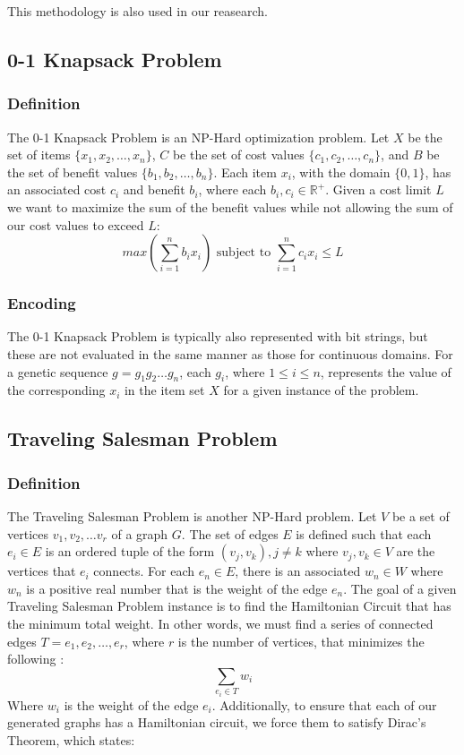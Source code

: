\noindent This methodology is also used in our reasearch.

%
%
\subsection*{0-1 Knapsack Problem}
\subsubsection*{Definition}

The 0-1 Knapsack Problem is an NP-Hard optimization problem. Let $X$ be the set of items $\{x_1, x_2, \ldots, x_n\}$, $C$ be the set of cost values $\{c_1, c_2, \ldots, c_n\}$, and $B$ be the set of benefit values $\{b_1, b_2, \ldots, b_n\}$. Each item $x_i$, with the domain $\{0,1\}$, has an associated cost $c_i$ and benefit $b_i$, where each $b_i,c_i \in \mathbb{R}^{+}$. Given a cost limit $L$ we want to maximize the sum of the benefit values while not allowing the sum of our cost values to exceed $L$:
\[ max\left( \sum\limits_{i = 1}^{n} b_ix_i \right) \text{ subject to } \sum\limits_{i = 1}^{n} c_ix_i \leq L \]

\subsubsection*{Encoding}
The  0-1 Knapsack Problem is typically also represented with bit strings, but these are not evaluated in the same manner as those for continuous domains. For a genetic sequence $g = g_1 g_2 \ldots g_n$, each $g_i$, where $1 \leq i \leq n$, represents the value of the corresponding $x_i$ in the item set $X$ for a given instance of the problem. 

%
%
\subsection*{Traveling Salesman Problem}
\subsubsection*{Definition}
The Traveling Salesman Problem is another NP-Hard problem. Let $V$ be a set of vertices $v_1, v_2, \ldots v_r$ of a graph $G$. The set of edges $E$ is defined such that each $e_i \in E$ is an ordered tuple of the form $(v_j,v_k), j \not = k$ where $v_j,v_k \in V$ are the vertices that $e_i$ connects. For each $e_n \in E$, there is an associated $w_n \in W$ where $w_n$ is a positive real number that is the weight of the edge $e_n$. The goal of a given Traveling Salesman Problem instance is to find the Hamiltonian Circuit that has the minimum total weight. In other words, we must find a series of connected edges $T = e_{1},e_{2},\ldots,e_{r}$, where $r$ is the number of vertices, that minimizes the following \cite{Haxhimusa11}:
\[\sum\limits_{e_{i} \in T} w_{i}\]
Where $w_{i}$ is the weight of the edge $e_{i}$. Additionally, to ensure that each of our generated graphs has a Hamiltonian circuit, we force them to satisfy Dirac's Theorem, which states:

